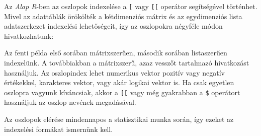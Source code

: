 \documentclass[
]{book}
\newenvironment{Shaded}{\begin{snugshade}}{\end{snugshade}}
\newcommand{\AttributeTok}[1]{\textcolor[rgb]{0.77,0.63,0.00}{#1}}
\newcommand{\CommentTok}[1]{\textcolor[rgb]{0.56,0.35,0.01}{\textit{#1}}}
\newcommand{\FunctionTok}[1]{\textcolor[rgb]{0.00,0.00,0.00}{#1}}
\newcommand{\NormalTok}[1]{#1}
\newcommand{\OtherTok}[1]{\textcolor[rgb]{0.56,0.35,0.01}{#1}}
\newcommand{\SpecialCharTok}[1]{\textcolor[rgb]{0.00,0.00,0.00}{#1}}
\newcommand{\StringTok}[1]{\textcolor[rgb]{0.31,0.60,0.02}{#1}}
\begin{document}
Az \emph{Alap R}-ben az oszlopok indexelése a \texttt{{[}} vagy \texttt{{[}{[}} operátor segítségével történhet. Mivel az adattáblák örökölték a kétdimenziós mátrix és az egydimenziós lista adatszerkezet indexelési lehetőségeit, így az oszlopokra négyféle módon hivatkozhatunk:

\begin{Shaded}
\end{Shaded}

Az fenti példa első sorában mátrixszerűen, második sorában listaszerűen indexelünk. A továbbiakban a mátrixszerű, azaz vesszőt tartalmazó hivatkozást használjuk. Az oszlopindex lehet numerikus vektor pozitív vagy negatív értékekkel, karakteres vektor, vagy akár logikai vektor is. Ha csak egyetlen oszlopra vagyunk kíváncsiak, akkor a \texttt{{[}{[}} vagy még gyakrabban a \texttt{\$} operátort használjuk az oszlop nevének megadásával.

Az oszlopok elérése mindennapos a statisztikai munka során, így ezeket az indexelési formákat ismernünk kell.

\begin{Shaded}
\end{Shaded}
\end{document}
